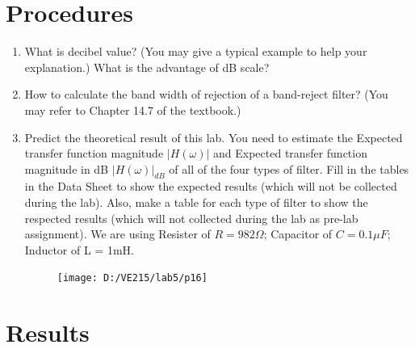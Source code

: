 \documentclass{article}
\begin{document}
\section{Procedures}
\begin{enumerate}
	\item What is decibel value? (You may give a typical example to help your explanation.)
	What is the advantage of dB scale?
	\item How to calculate the band width of rejection of a band-reject filter? (You may
	refer to Chapter 14.7 of the textbook.)
	\item Predict the theoretical result of this lab. You need to estimate the Expected
	transfer function magnitude $|H(\omega)|$ and Expected transfer function magnitude in
	dB $|H(\omega)|_{dB}$  of all of the four types of filter. Fill in the tables in the Data Sheet
	to show the expected results (which will not be collected during the lab). Also,
	make a table for each type of filter to show the respected results (which will not
	collected during the lab as pre-lab assignment). We are using Resister of $R =
	982\Omega$; Capacitor of $C = 0.1\mu F$; Inductor of L = 1mH.
	\begin{figure}[H]
		\centering
		\texttt{[image: D:/VE215/lab5/p16]}
		\label{fig:p16}
	\end{figure}
\end{enumerate}
\section{Results}
\end{document}
